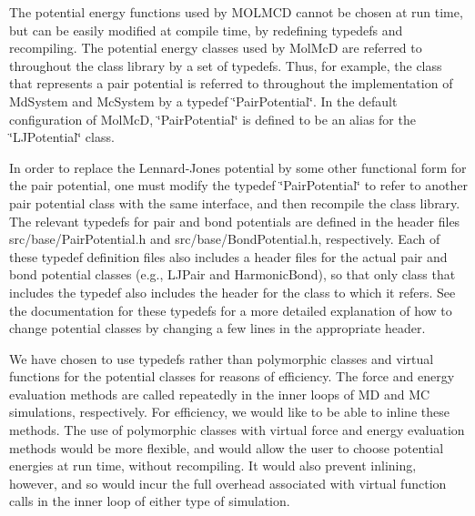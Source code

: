 \-The potential energy functions used by \-M\-O\-L\-M\-C\-D cannot be chosen at run time, but can be easily modified at compile time, by redefining typedefs and recompiling. \-The potential energy classes used by \-Mol\-Mc\-D are referred to throughout the class library by a set of typedefs. \-Thus, for example, the class that represents a pair potential is referred to throughout the implementation of \-Md\-System and \-Mc\-System by a typedef \char`\"{}\-Pair\-Potential\char`\"{}. \-In the default configuration of \-Mol\-Mc\-D, \char`\"{}\-Pair\-Potential\char`\"{} is defined to be an alias for the \char`\"{}\-L\-J\-Potential\char`\"{} class.

\-In order to replace the \-Lennard-\/\-Jones potential by some other functional form for the pair potential, one must modify the typedef \char`\"{}\-Pair\-Potential\char`\"{} to refer to another pair potential class with the same interface, and then recompile the class library. \-The relevant typedefs for pair and bond potentials are defined in the header files src/base/\-Pair\-Potential.\-h and src/base/\-Bond\-Potential.\-h, respectively. \-Each of these typedef definition files also includes a header files for the actual pair and bond potential classes (e.\-g., \-L\-J\-Pair and \-Harmonic\-Bond), so that only class that includes the typedef also includes the header for the class to which it refers. \-See the documentation for these typedefs for a more detailed explanation of how to change potential classes by changing a few lines in the appropriate header.

\-We have chosen to use typedefs rather than polymorphic classes and virtual functions for the potential classes for reasons of efficiency. \-The force and energy evaluation methods are called repeatedly in the inner loops of \-M\-D and \-M\-C simulations, respectively. \-For efficiency, we would like to be able to inline these methods. \-The use of polymorphic classes with virtual force and energy evaluation methods would be more flexible, and would allow the user to choose potential energies at run time, without recompiling. \-It would also prevent inlining, however, and so would incur the full overhead associated with virtual function calls in the inner loop of either type of simulation.

